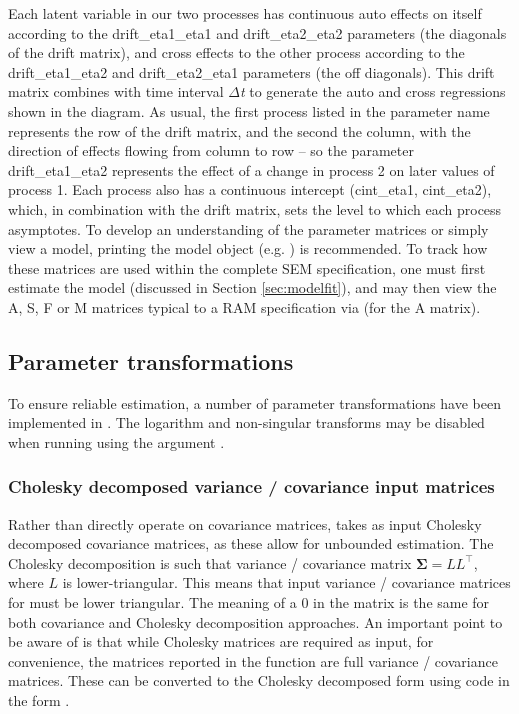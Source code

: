 \documentclass[nojss]{jss}\usepackage[]{graphicx}\usepackage[]{color}
\begin{document}
Each latent variable in our two processes has continuous auto effects on itself according to the drift\_eta1\_eta1 and drift\_eta2\_eta2 parameters (the diagonals of the drift matrix), and cross effects to the other process according to the drift\_eta1\_eta2 and drift\_eta2\_eta1 parameters (the off diagonals). This drift matrix combines with time interval $\Delta$\textit{t} to generate the auto and cross regressions shown in the diagram.  As usual, the first process listed in the parameter name represents the row of the drift matrix, and the second the column, with the direction of effects flowing from column to row -- so the parameter drift\_eta1\_eta2 represents the effect of a change in process 2 on later values of process 1. 
Each process also has a continuous intercept (cint{\_}eta1, cint{\_}eta2), which, in combination with the drift matrix, sets the level to which each process asymptotes.
To develop an understanding of the parameter matrices or simply view a model, printing the model object (e.g. ) is recommended. To track how these matrices are used within the complete SEM specification, one must first estimate the model (discussed in Section \ref{sec:modelfit}), and may then view the A, S, F or M matrices typical to a RAM specification \citet{mcardle1984algebraic} via  (for the A matrix).

\subsection{Parameter transformations} \label{sec:transforms}\nopagebreak
To ensure reliable estimation, a number of parameter transformations have been implemented in . The logarithm and non-singular transforms may be disabled when running  using the argument .

\subsubsection{Cholesky decomposed variance / covariance input matrices}\nopagebreak
Rather than directly operate on covariance matrices,  takes as input Cholesky decomposed covariance matrices, as these allow for unbounded estimation. The Cholesky decomposition is such that variance / covariance matrix $\boldsymbol{\Sigma} = LL^\top$, where $L$ is lower-triangular. This means that input variance / covariance matrices for  must be lower triangular. The meaning of a 0 in the matrix is the same for both covariance and Cholesky decomposition approaches. An important point to be aware of is that while Cholesky matrices are required as input, for convenience, the matrices reported in the  function are full variance / covariance matrices. These can be converted to the Cholesky decomposed form using code in the form .
\end{document}
